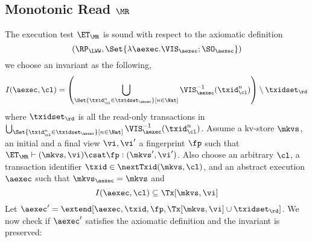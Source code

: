 \subsection{Monotonic Read \( \MR \)}
\label{sec:sound-complete-mr}

The execution test $\ET_\MR$ is sound with respect to the axiomatic definition 
\[(\RP_{\LWW}, \Set{\lambda \aexec. \VIS_{\aexec} ; \SO_{\aexec} })\]
we choose an invariant as the following,  
\[
    I(\aexec, \cl) = \left( \bigcup_{\Set{\txid_{\cl}^{n} \in \txidset_{\aexec} }[ n \in \Nat]} \VIS_{\aexec}^{-1}(\txid^n_\cl) \right) \setminus \txidset_\rd
\]
where \( \txidset_\rd \) is all the read-only transactions in 
\( \bigcup_{\Set{\txid_{\cl}^{n} \in \txidset_{\aexec} }[ n \in \Nat]} \VIS_{\aexec}^{-1}(\txid^n_\cl) \).
Assume a kv-store $\mkvs$, an initial and a final view $\vi, \vi'$  a fingerprint $\fp$ 
such that $\ET_{\MR} \vdash (\mkvs, \vi) \csat \fp: (\mkvs',\vi')$. 
Also choose an arbitrary $\cl$, a transaction identifier $\txid \in \nextTxid(\mkvs, \cl)$, 
and an abstract execution $\aexec$ such that $\mkvs_{\aexec} = \mkvs$ and 
\begin{equation}
I(\aexec, \cl) \subseteq \Tx[\mkvs, \vi]
\label{eq:mr_invariant}
\end{equation}
Let \( \aexec' = \extend[\aexec, \txid, \fp, \Tx[\mkvs, \vi] \cup \txidset_\rd] \).
We now check if \( \aexec' \) satisfies the axiomatic definition and the invariant is preserved:
